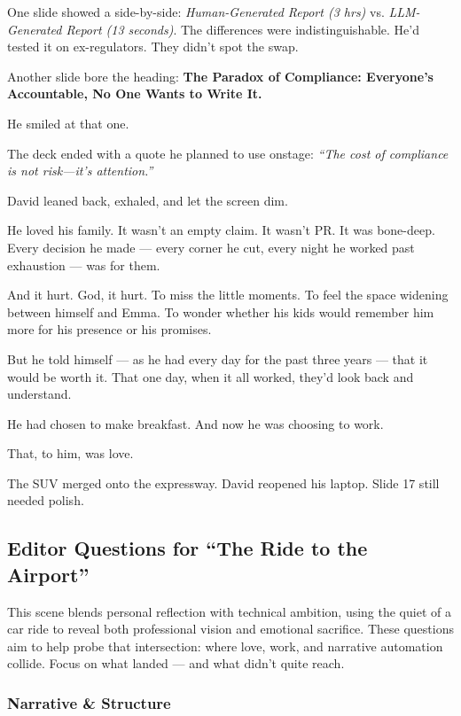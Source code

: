 \medskip

One slide showed a side-by-side:
\textit{Human-Generated Report (3 hrs)} vs. \textit{LLM-Generated Report (13 seconds)}.
The differences were indistinguishable. He’d tested it on ex-regulators. They didn’t spot the swap.

Another slide bore the heading:
\textbf{The Paradox of Compliance: Everyone’s Accountable, No One Wants to Write It.}

He smiled at that one.

The deck ended with a quote he planned to use onstage:
\textit{“The cost of compliance is not risk—it’s attention.”}

David leaned back, exhaled, and let the screen dim.

He loved his family.
It wasn’t an empty claim. It wasn’t PR. It was bone-deep.
Every decision he made — every corner he cut, every night he worked past exhaustion — was for them.

And it hurt. God, it hurt.
To miss the little moments. To feel the space widening between himself and Emma.
To wonder whether his kids would remember him more for his presence or his promises.

But he told himself --- as he had every day for the past three years --- that it would be worth it.
That one day, when it all worked, they’d look back and understand.

He had chosen to make breakfast.
And now he was choosing to work.

That, to him, was love.

The SUV merged onto the expressway.
David reopened his laptop.
Slide 17 still needed polish.

\subsection*{Editor Questions for ``The Ride to the Airport''}

This scene blends personal reflection with technical ambition, using the quiet of a car ride to reveal both professional vision and emotional sacrifice. These questions aim to help probe that intersection: where love, work, and narrative automation collide. Focus on what landed — and what didn’t quite reach.

\subsubsection{Narrative \& Structure}

